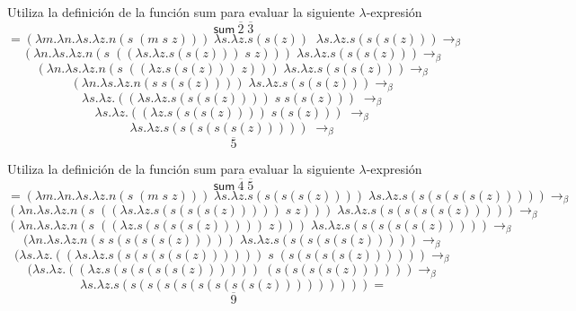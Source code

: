         \begin{exercise}
            Utiliza la definición de la función \textsf{sum} para evaluar la siguiente  $\lambda$-expresión
            \[
                \textsf{sum}\  \overline{2} \; \overline{3} 
            \]
            \[
                = (\lambda m.\lambda n.\lambda s.\lambda z.n(s \; (m\; s \; z))) \; \lambda s.\lambda z.s(s(z)) \;\; \lambda s.\lambda z.s(s(s(z))) \rightarrow_\beta 
            \]
           \[
                (\lambda n.\lambda s.\lambda z.n(s \; ((\lambda s.\lambda z.s(s(z)))\; s \; z))) \; \lambda s.\lambda z.s(s(s(z))) \rightarrow_\beta 
            \]
           \[
                (\lambda n.\lambda s.\lambda z.n(s \; ((\lambda z.s(s(z))) \; z))) \; \lambda s.\lambda z.s(s(s(z))) \rightarrow_\beta 
            \]
           \[
                (\lambda n.\lambda s.\lambda z.n (s \; s(s(z)))) \; \lambda s.\lambda z.s(s(s(z))) \rightarrow_\beta 
            \]
           \[
                \lambda s.\lambda z.((\lambda s.\lambda z.s(s(s(z))))\; s \; s(s(z))) \; \rightarrow_\beta 
            \]
           \[
                \lambda s.\lambda z.((\lambda z.s(s(s(z)))) \; s(s(z))) \; \rightarrow_\beta 
            \]
           \[
                \lambda s.\lambda z.s(s(s(s(s(z))))) \; \rightarrow_\beta 
            \]
		\[
			\overline{5}
		\]
         
        \end{exercise}

        \begin{exercise}
            Utiliza la definición de la función \textsf{sum} para evaluar la siguiente  $\lambda$-expresión
            \[
                \textsf{sum}\  \overline{4} \; \overline{5} 
            \]
            \[
                = (\lambda m.\lambda n.\lambda s.\lambda z.n(s \; (m\;s\;z))) \; \lambda s.\lambda z.s(s(s(s(z)))) \; \lambda s.\lambda z.s(s(s(s(s(z))))) \rightarrow_\beta 
            \]
	     \[
                (\lambda n.\lambda s.\lambda z.n(s \; ((\lambda s.\lambda z.s(s(s(s(z)))))\;s\;z))) \; \lambda s.\lambda z.s(s(s(s(s(z))))) \rightarrow_\beta 
            \]
		\[
                (\lambda n.\lambda s.\lambda z.n(s \; ((\lambda z.s(s(s(s(z)))))\;z))) \; \lambda s.\lambda z.s(s(s(s(s(z))))) \rightarrow_\beta 
            \]
		\[
                (\lambda n.\lambda s.\lambda z.n(s \; s(s(s(s(z))))) \; \lambda s.\lambda z.s(s(s(s(s(z))))) \rightarrow_\beta 
            \]
		\[
                (\lambda s.\lambda z.((\lambda s.\lambda z.s(s(s(s(s(z))))))\; s \; (s(s(s(s(z)))))) \rightarrow_\beta 
            \]
		\[
                (\lambda s.\lambda z.((\lambda z.s(s(s(s(s(z)))))) \; (s(s(s(s(z)))))) \rightarrow_\beta 
            \]
		\[
                \lambda s.\lambda z.s(s(s(s(s(s(s(s(s(z))))))))) = 
            \]
		\[
			\overline{9}
		\]
          
        \end{exercise}

